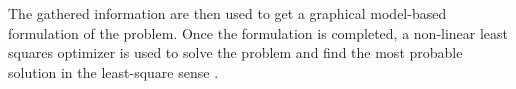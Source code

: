 The gathered information are then used to get a graphical model-based formulation of the problem. 
Once the formulation is completed, a non-linear least squares optimizer is used to solve the problem and find the most probable solution in the least-square sense \cite{ceres-solver}.





